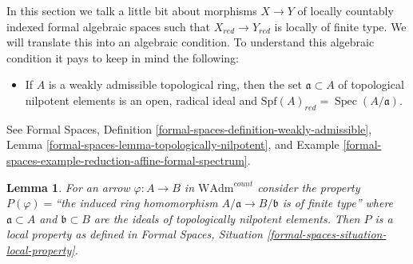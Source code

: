 \documentclass{stacks-project}
\theoremstyle{plain}
\newtheorem{lemma}[subsection]{Lemma}
\theoremstyle{definition}
\theoremstyle{remark}
\numberwithin{equation}{subsection}
\def\Spec{\mathop{\mathrm{Spec}}}
\begin{document}
\noindent
In this section we talk a little bit about morphisms $X \to Y$
of locally countably indexed formal algebraic spaces such that
$X_{red} \to Y_{red}$ is locally of finite type. We will translate
this into an algebraic condition. To understand this algebraic
condition it pays to keep in mind the following:
\begin{itemize}
\item If $A$ is a weakly admissible topological ring, then the
set $\mathfrak a \subset A$ of topological nilpotent elements
is an open, radical ideal and
$\text{Spf}(A)_{red} = \Spec(A/\mathfrak a)$.
\end{itemize}
See Formal Spaces, Definition
\ref{formal-spaces-definition-weakly-admissible},
Lemma \ref{formal-spaces-lemma-topologically-nilpotent}, and
Example \ref{formal-spaces-example-reduction-affine-formal-spectrum}.

\begin{lemma}
\label{lemma-finite-type-red}
For an arrow $\varphi : A \to B$ in $\text{WAdm}^{count}$ consider
the property $P(\varphi)=$``the induced ring homomorphism
$A/\mathfrak a \to B/\mathfrak b$ is of finite type''
where $\mathfrak a \subset A$ and $\mathfrak b \subset B$ are the ideals
of topologically nilpotent elements. Then $P$ is a local property
as defined in
Formal Spaces, Situation
\ref{formal-spaces-situation-local-property}.
\end{lemma}
\end{document}
